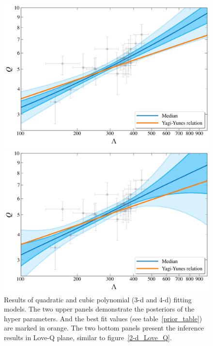 \documentclass[a4paper,11pt]{article}
\begin{document}
\begin{figure}
    \begin{minipage}[t]{0.49\textwidth}
    \includegraphics[width=\linewidth]{hierarchical_results_AP4_3d.png}%
    \end{minipage}
    \hfill
    \begin{minipage}[t]{0.49\textwidth}
    \includegraphics[width=\linewidth]{hierarchical_results_AP4_4d.png}
    \end{minipage}
    \caption{\label{3-d_4-d_Love_Q} Results of quadratic and cubic polynomial (3-d and 4-d) fitting models. The 
    two upper panels demonstrate the posteriors of the hyper parameters. And the best fit values (see table~\ref{prior_table}) 
    are marked in orange. The two bottom panels present the inference results in Love-Q plane, similar to 
    figure~\ref{2-d_Love_Q}.
    }
\end{figure}
\end{document}
